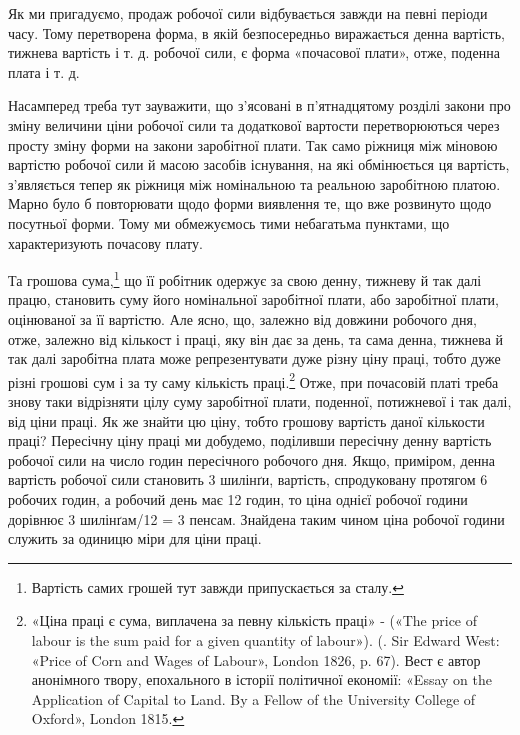 Як ми пригадуємо, продаж робочої сили відбувається завжди
на певні періоди часу. Тому перетворена форма, в якій безпосередньо
виражається денна вартість, тижнева вартість і т. д. робочої
сили, є форма «почасової плати», отже, поденна плата і т. д.

Насамперед треба тут зауважити, що з’ясовані в п’ятнадцятому
розділі закони про зміну величини ціни робочої сили та додаткової
вартости перетворюються через просту зміну форми
на закони заробітної плати. Так само ріжниця між міновою вартістю
робочої сили й масою засобів існування, на які обмінюється
ця вартість, з’являється тепер як ріжниця між номінальною та
реальною заробітною платою. Марно було б повторювати щодо
форми виявлення те, що вже розвинуто щодо посутньої форми.
Тому ми обмежуємось тими небагатьма пунктами, що характеризують
почасову плату.

Та грошова сума,\footnote{
Вартість самих грошей тут завжди припускається за сталу.
} що її робітник одержує за свою денну,
тижневу й так далі працю, становить суму його номінальної
заробітної плати, або заробітної плати, оцінюваної за її вартістю.
Але ясно, що, залежно від довжини робочого дня, отже,
залежно від кількост і праці, яку він дає за день, та сама денна,
тижнева й так далі заробітна плата може репрезентувати дуже
різну ціну праці, тобто дуже різні грошові сум і за ту саму кількість
праці.\footnote{
«Ціна праці є сума, виплачена за певну кількість праці» - («The
price of labour is the sum paid for a given quantity of labour»). (. Sir Edward
West: «Price of Corn and Wages of Labour», London 1826, p. 67).
Вест є автор анонімного твору, епохального в історії політичної економії:
«Essay on the Application of Capital to Land. By a Fellow of the
University College of Oxford», London 1815.
} Отже, при почасовій платі треба знову таки відрізняти
цілу суму заробітної плати, поденної, потижневої і так
далі, від ціни праці. Як же знайти цю ціну, тобто грошову вартість
даної кількости праці? Пересічну ціну праці ми добудемо,
поділивши пересічну денну вартість робочої сили на число годин
пересічного робочого дня. Якщо, приміром, денна вартість
робочої сили становить 3 шилінґи, вартість, спродуковану протягом
6 робочих годин, а робочий день має 12 годин, то ціна однієї
робочої години дорівнює 3 шилінґам/12 = 3 пенсам. Знайдена
таким чином ціна робочої години служить за одиницю міри для
ціни праці.

